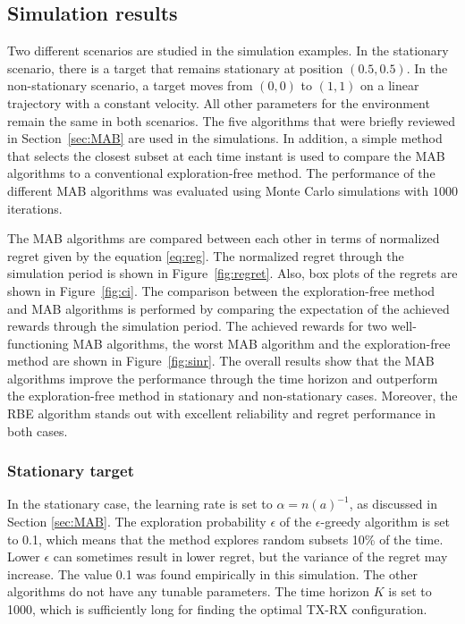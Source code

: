 \documentclass[english, 12pt, a4paper, elec, utf8, a-1b, online]{aaltothesis}
\numberwithin{equation}{section}
\begin{document}
\subsection{Simulation results}

Two different scenarios are studied in the simulation examples. 
In the stationary scenario, there is a target that remains stationary at position $(0.5, 0.5)$.
In the non-stationary scenario, a target moves from $(0, 0)$ to $(1, 1)$ on a linear trajectory with a constant velocity.
All other parameters for the environment remain the same in both scenarios.
The five algorithms that were briefly reviewed in Section~\ref{sec:MAB} are used in the simulations.
In addition, a simple method that selects the closest subset at each time instant is used to compare the MAB algorithms to a conventional exploration-free method. 
The performance of the different MAB algorithms was evaluated using Monte Carlo simulations with $1000$ iterations.

The MAB algorithms are compared between each other in terms of normalized regret given by the equation \eqref{eq:reg}. 
The normalized regret through the simulation period is shown in Figure~\ref{fig:regret}.
Also, box plots of the regrets are shown in Figure~\ref{fig:ci}.
The comparison between the exploration-free method and MAB algorithms is performed by comparing the expectation of the achieved rewards through the simulation period.
The achieved rewards for two well-functioning MAB algorithms, 
the worst MAB algorithm and the exploration-free method are shown in Figure~\ref{fig:sinr}.
The overall results show that the MAB algorithms improve the performance through the time horizon and outperform the exploration-free method in stationary and non-stationary cases.
Moreover, the RBE algorithm stands out with excellent reliability and regret performance in both cases.

\subsubsection{Stationary target}

In the stationary case, the learning rate is set to $\alpha=n(a)^{-1}$, as discussed in Section \ref{sec:MAB}.
The exploration probability $\epsilon$ of the $\epsilon$-greedy algorithm is set to 0.1, which means that the method explores random subsets 10\% of the time.
Lower $\epsilon$ can sometimes result in lower regret, but the variance of the regret may increase.
The value 0.1 was found empirically in this simulation.
The other algorithms do not have any tunable parameters.
The time horizon $K$ is set to 1000, which is sufficiently long for finding the optimal TX-RX configuration.
\end{document}
